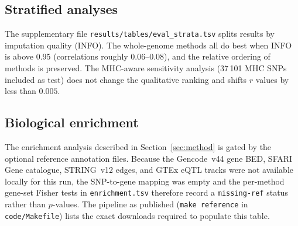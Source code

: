 \subsection{Stratified analyses}

The supplementary file \texttt{results/tables/eval\_strata.tsv} splits
results by imputation quality (INFO). The whole-genome methods all do
best when INFO is above 0.95 (correlations roughly 0.06--0.08), and
the relative ordering of methods is preserved. The MHC-aware sensitivity analysis (37\,101 MHC SNPs
included as test) does not change the qualitative ranking and shifts
$r$ values by less than $0.005$.

\subsection{Biological enrichment}

The enrichment analysis described in Section~\ref{sec:method} is gated
by the optional reference annotation files. Because the Gencode~v44
gene BED, SFARI Gene catalogue, STRING~v12 edges, and GTEx eQTL tracks
were not available locally for this run, the SNP-to-gene mapping was
empty and the per-method gene-set Fisher tests in
\texttt{enrichment.tsv} therefore record a \texttt{missing-ref} status
rather than $p$-values. The pipeline as published (\texttt{make
reference} in \texttt{code/Makefile}) lists the exact downloads
required to populate this table.
